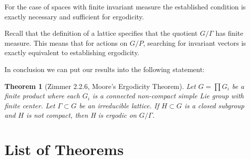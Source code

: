\documentclass[
  12pt
]{article}
\numberwithin{equation}{section}
\newtheorem{thm}{Theorem}[section]
\theoremstyle{plain}
\begin{document}
  For the case of spaces with finite invariant measure the established condition is exactly necessary and sufficient for ergodicity.

  Recall that the definition of a lattice specifies that the quotient $G/\Gamma$
  has finite measure. This means that for actions on $G/P$, searching for
  invariant vectors is exactly equivalent to establishing ergodicity.

  In conclusion we can put our results into the following statement:

  \begin{thm}[Zimmer 2.2.6, Moore's Ergodicity Theorem]
    \label{thm:2.2.6}
    Let $G = \prod G_i$ be a finite product where each $G_i$ is a connected
    non-compact simple Lie group with finite center. Let $\Gamma \subset G$ be
    an irreducible lattice. If $H \subset G$ is a closed subgroup and $H$ is
    not compact, then H is ergodic on $G/\Gamma$.
  \end{thm}









\cleardoublepage


\section{List of Theorems}

{}
\listoffigures

{}
\printbibliography

\end{document}
